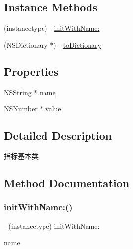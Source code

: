 \subsection*{Instance Methods}
\begin{DoxyCompactItemize}
\item 
(instancetype) -\/ \mbox{\hyperlink{interface_alibc_trade_measure_a39211adccd1c3d149c03239b5729104e}{init\+With\+Name\+:}}
\end{DoxyCompactItemize}
\textbf{ }\par
\begin{DoxyCompactItemize}
\item 
(N\+S\+Dictionary $\ast$) -\/ \mbox{\hyperlink{interface_alibc_trade_measure_a4818f953321d6bcd0464878b7d50e701}{to\+Dictionary}}
\end{DoxyCompactItemize}

\subsection*{Properties}
\begin{DoxyCompactItemize}
\item 
N\+S\+String $\ast$ \mbox{\hyperlink{interface_alibc_trade_measure_ac1117cd29a21f311f4cb02cb71370a3f}{name}}
\item 
N\+S\+Number $\ast$ \mbox{\hyperlink{interface_alibc_trade_measure_a7c4afe61c46f3f078b1d1802c9600eca}{value}}
\end{DoxyCompactItemize}


\subsection{Detailed Description}
指标基本类 

\subsection{Method Documentation}
\mbox{\label{interface_alibc_trade_measure_a39211adccd1c3d149c03239b5729104e}} 
\subsubsection{\texorpdfstring{init\+With\+Name\+:()}{initWithName:()}}
{\footnotesize\ttfamily -\/ (instancetype) init\+With\+Name\+: \begin{DoxyParamCaption}\item[{(nonnull N\+S\+String $\ast$)}]{name }\end{DoxyParamCaption}}

